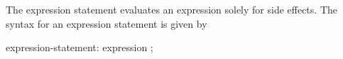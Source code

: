 The expression statement evaluates an expression solely for side
effects. The syntax for an expression statement is given by
\begin{syntax}
expression-statement:
  expression ;
\end{syntax}
